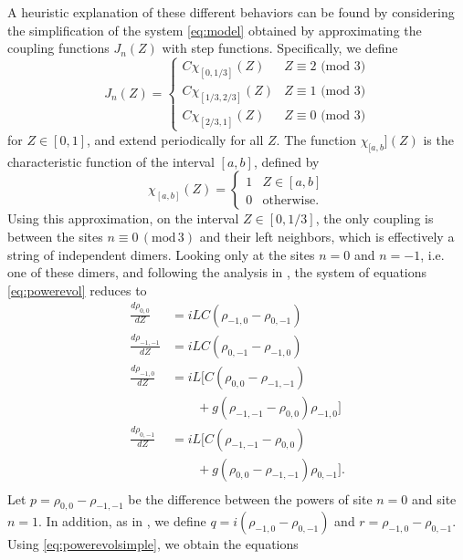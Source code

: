 \documentclass[reprint, amsmath,amssymb,aps,pre]{revtex4-2}
\begin{document}
A heuristic explanation of these different behaviors can be found by considering the simplification of the system \cref{eq:model} obtained by approximating the coupling functions $J_n(Z)$ with step functions. Specifically, we define
\begin{equation}\label{eq:simpleJn}
J_n(Z) = \begin{cases}
C\chi_{[0,1/3]}(Z) & Z \equiv 2 \text{ (mod 3)} \\
C\chi_{[1/3,2/3]}(Z) & Z \equiv 1 \text{ (mod 3)}\\
C\chi_{[2/3,1]}(Z) & Z \equiv 0 \text{ (mod 3)}
\end{cases}
\end{equation}
for $Z \in [0,1]$, and extend periodically for all $Z$. The function $\chi_{[a,b}](Z)$ is the characteristic function of the interval $[a,b]$, defined by
\[
\chi_{[a,b]}(Z) = \begin{cases}
1 & Z \in [a,b] \\
0 & \text{otherwise}.
\end{cases}
\]
Using this approximation, on the interval $Z \in [0, 1/3]$, the only coupling is between the sites $n \equiv0\,(\text{mod}\,3)$ and their left neighbors, which is effectively a string of independent dimers. Looking only at the sites $n=0$ and $n=-1$, i.e. one of these dimers, and following the analysis in \cite{Kenkre1986}, the system of equations \cref{eq:powerevol} reduces to 
\begin{equation}\label{eq:powerevolsimple}
\begin{aligned}
\frac{d\rho_{0,0}}{dZ} &= iLC \left( \rho_{-1,0} - \rho_{0,-1} \right) \\
\frac{d\rho_{-1,-1}}{dZ}  &= iLC \left( \rho_{0,-1} - \rho_{-1,0} \right) \\
\frac{d\rho_{-1,0} }{dZ} &= iL \big[ C(\rho_{0,0} - \rho_{-1,-1}) \\
&\qquad + g ( \rho_{-1,-1} - \rho_{0,0}) \rho_{-1,0} \big] \\
\frac{d\rho_{0,-1}}{dZ}  &= iL \big[ C(\rho_{-1,-1} - \rho_{0,0}) \\
&\qquad + g ( \rho_{0,0} - \rho_{-1,-1} ) \rho_{0,-1} \big].\\
\end{aligned}
\end{equation}
Let $p = \rho_{0,0} - \rho_{-1,-1}$ be the difference between the powers of site $n=0$ and site $n=1$. In addition, as in \cite{Kenkre1989}, we define $q = i(\rho_{-1,0} - \rho_{0,-1})$ and $r = \rho_{-1,0} - \rho_{0,-1}$. Using \cref{eq:powerevolsimple}, we obtain the equations
\end{document}
